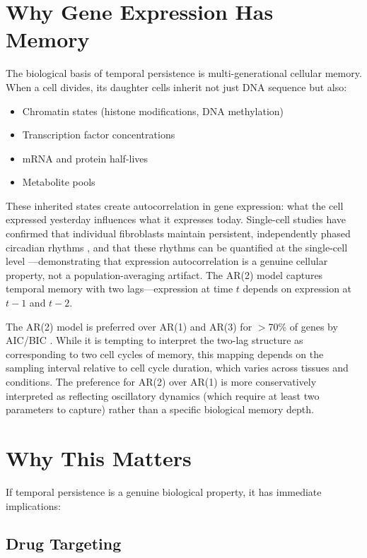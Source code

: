 \documentclass[11pt,letterpaper]{article}
\begin{document}
\section{Why Gene Expression Has Memory}

The biological basis of temporal persistence is multi-generational cellular memory. When a cell divides, its daughter cells inherit not just DNA sequence but also:

\begin{itemize}
\item Chromatin states (histone modifications, DNA methylation) \citep{heard2014transgenerational}
\item Transcription factor concentrations
\item mRNA and protein half-lives
\item Metabolite pools
\end{itemize}

These inherited states create autocorrelation in gene expression: what the cell expressed yesterday influences what it expresses today. Single-cell studies have confirmed that individual fibroblasts maintain persistent, independently phased circadian rhythms \citep{welsh2004bioluminescence}, and that these rhythms can be quantified at the single-cell level \citep{westermark2009quantification}---demonstrating that expression autocorrelation is a genuine cellular property, not a population-averaging artifact. The AR(2) model captures temporal memory with two lags---expression at time $t$ depends on expression at $t-1$ and $t-2$.

The AR(2) model is preferred over AR(1) and AR(3) for $>$70\% of genes by AIC/BIC \citep{whiteside2026par2a}. While it is tempting to interpret the two-lag structure as corresponding to two cell cycles of memory, this mapping depends on the sampling interval relative to cell cycle duration, which varies across tissues and conditions. The preference for AR(2) over AR(1) is more conservatively interpreted as reflecting oscillatory dynamics (which require at least two parameters to capture) rather than a specific biological memory depth.

\section{Why This Matters}

If temporal persistence is a genuine biological property, it has immediate implications:

\subsection{Drug Targeting}
\end{document}
